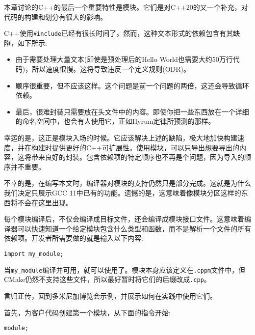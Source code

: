 本章讨论的C++的最后一个重要特性是模块。它们是对C++20的又一个补充，对代码的构建和划分有很大的影响。

C++使用\texttt{\#include}已经有很长时间了。然而，这种文本形式的依赖包含有其缺陷，如下所示:

\begin{itemize}
\item 
由于需要处理大量文本(即使是预处理后的Hello World也需要大约50万行代码)，所以速度很慢。这将导致违反一个定义规则(ODR)。

\item 
顺序很重要，但不应该这样。这个问题是前一个问题的两倍，这还会导致循环依赖。

\item 
最后，很难封装只需要放在头文件中的内容。即使你把一些东西放在一个详细的命名空间中，也会有人使用它，正如Hyrum定律所预测的那样。
\end{itemize}

幸运的是，这正是模块入场的时候。它应该解决上述的缺陷，极大地加快构建速度，并在构建时提供更好的C++可扩展性。使用模块，可以只导出想要导出的内容，这将带来良好的封装。包含依赖项的特定顺序也不再是个问题，因为导入的顺序并不重要。

\begin{tcolorbox}[colback=blue!5!white,colframe=blue!75!black, title=Note]
\hspace*{0.7cm}不幸的是，在编写本文时，编译器对模块的支持仍然只是部分完成。这就是为什么我们决定只展示GCC 11中已有的功能。遗憾的是，这意味着像模块分区这样的东西将不会在这里出现。
\end{tcolorbox}

每个模块编译后，不仅会编译成目标文件，还会编译成模块接口文件。这意味着编译器可以快速知道一个给定模块包含什么类型和函数，而不是解析一个文件的所有依赖项。开发者所需要做的就是输入以下内容:

\begin{lstlisting}[style=styleCXX]
import my_module;
\end{lstlisting}

当\texttt{my\_module}编译并可用，就可以使用了。模块本身应该定义在\texttt{.cppm}文件中，但CMake仍然不支持这些文件，所以最好暂时将它们的后缀改成\texttt{.cpp}。

言归正传，回到多米尼加博览会示例，并展示如何在实践中使用它们。

首先，为客户代码创建第一个模块，从下面的指令开始:

\begin{lstlisting}[style=styleCXX]
module;
\end{lstlisting}

